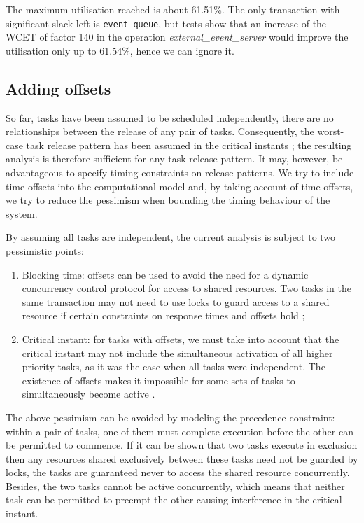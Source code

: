 \documentclass{article}
\begin{document}
The maximum utilisation reached is about 61.51\%. The only transaction with significant slack left is \texttt{event\_queue}, but tests show that an increase of the WCET of factor 140 in the operation \textit{external\_event\_server} would improve the utilisation only up to 61.54\%, hence we can ignore it.

\subsection{Adding offsets}

So far, tasks have been assumed to be scheduled independently, there are no relationships between the release of any pair of tasks. Consequently, the worst-case task release pattern has been assumed in the critical instants \cite{critical-instants}; the resulting analysis is therefore sufficient for any task release pattern. It may, however, be advantageous to specify timing constraints on release patterns. We try to include time offsets into the computational model and, by taking account of time offsets, we try to reduce the pessimism when bounding the timing behaviour of the system.

By assuming all tasks are independent, the current analysis is subject to two pessimistic points:

\begin{enumerate}
   \item Blocking time: offsets can be used to avoid the need for a dynamic concurrency control protocol for access to shared resources. Two tasks in the same transaction may not need to use locks to guard access to a shared resource if certain constraints on response times and offsets hold \cite{tindell-offsets};
   \item Critical instant: for tasks with offsets, we must take into account that the critical instant may not include the simultaneous activation of all higher priority tasks, as it was the case when all tasks were independent. The existence of offsets makes it impossible for some sets of tasks to simultaneously become active \cite{pessimistic-rma}.
\end{enumerate}

The above pessimism can be avoided by modeling the precedence constraint: within a pair of tasks, one of them must complete execution before the other can be permitted to commence. If it can be shown that two tasks execute in exclusion then any resources shared exclusively between these tasks need not be guarded by locks, the tasks are guaranteed never to access the shared resource concurrently. Besides, the two tasks cannot be active concurrently, which means that neither task can be permitted to preempt the other causing interference in the critical instant.
\end{document}
